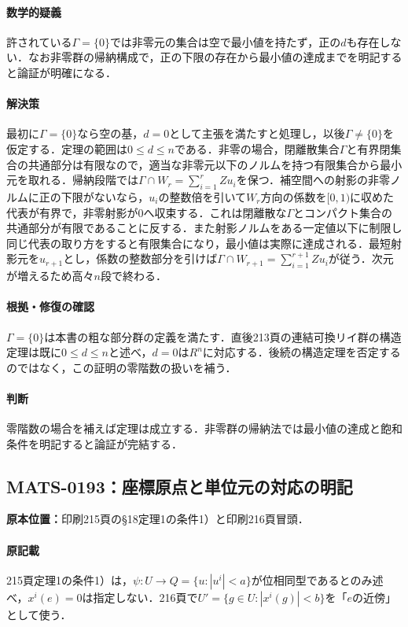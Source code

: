 \documentclass[a4paper,10pt]{ltjsarticle}
\begin{document}
\paragraph{数学的疑義}許されている$\Gamma=\{0\}$では非零元の集合は空で最小値を持たず，正の$d$も存在しない．なお非零群の帰納構成で，正の下限の存在から最小値の達成までを明記すると論証が明確になる．

\paragraph{解決策}最初に$\Gamma=\{0\}$なら空の基，$d=0$として主張を満たすと処理し，以後$\Gamma\ne\{0\}$を仮定する．定理の範囲は$0\le d\le n$である．非零の場合，閉離散集合$\Gamma$と有界閉集合の共通部分は有限なので，適当な非零元以下のノルムを持つ有限集合から最小元を取れる．帰納段階では$\Gamma\cap W_r=\sum_{i=1}^rZ u_i$を保つ．補空間への射影の非零ノルムに正の下限がないなら，$u_i$の整数倍を引いて$W_r$方向の係数を$[0,1)$に収めた代表が有界で，非零射影が0へ収束する．これは閉離散な$\Gamma$とコンパクト集合の共通部分が有限であることに反する．また射影ノルムをある一定値以下に制限し同じ代表の取り方をすると有限集合になり，最小値は実際に達成される．最短射影元を$u_{r+1}$とし，係数の整数部分を引けば$\Gamma\cap W_{r+1}=\sum_{i=1}^{r+1}Zu_i$が従う．次元が増えるため高々$n$段で終わる．

\paragraph{根拠・修復の確認}$\Gamma=\{0\}$は本書の粗な部分群の定義を満たす．直後213頁の連結可換リイ群の構造定理は既に$0\le d\le n$と述べ，$d=0$は$R^n$に対応する．後続の構造定理を否定するのではなく，この証明の零階数の扱いを補う．

\paragraph{判断}零階数の場合を補えば定理は成立する．非零群の帰納法では最小値の達成と飽和条件を明記すると論証が完結する．


\subsection*{MATS-0193：座標原点と単位元の対応の明記}\label{math:MATS-0193}
\noindent\textbf{原本位置：}印刷215頁の§18定理1の条件1）と印刷216頁冒頭．

\paragraph{原記載}215頁定理1の条件1）は，$\psi:U\to Q=\{u:|u^i|<a\}$が位相同型であるとのみ述べ，$x^i(e)=0$は指定しない．216頁で$U\prime=\{g\in U:|x^i(g)|<b\}$を「$e$の近傍」として使う．
\end{document}

